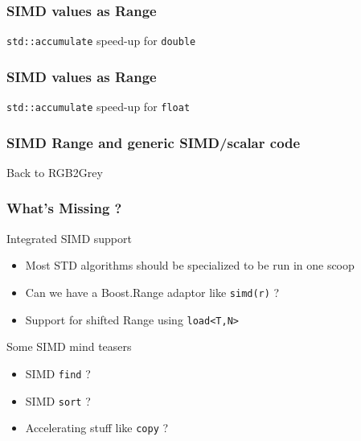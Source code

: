 \frame
{
  \frametitle{SIMD values as Range}
  \begin{block}{\texttt{std::accumulate} speed-up for \texttt{double}}
  \begin{center}
  \end{center}
  \end{block}{}
}


\frame
{
  \frametitle{SIMD values as Range}
  \begin{block}{\texttt{std::accumulate} speed-up for \texttt{float}}
  \begin{center}
  \end{center}
  \end{block}{}
}

\frame
{
  \frametitle{SIMD Range and generic SIMD/scalar code}
  \begin{block}{Back to RGB2Grey}
  \begin{center}
  \lstrangergb
  \end{center}
  \end{block}{}
}

\frame
{
  \frametitle{What's Missing ?}
  \begin{block}{Integrated SIMD support}
  \begin{itemize}\footnotesize
  \item Most STD algorithms should be specialized to be run in one scoop
  \item Can we have a Boost.Range adaptor like \texttt{simd(r)} ?
  \item Support for shifted Range using \texttt{load<T,N>}
  \end{itemize}
  \end{block}{}

  \begin{block}{Some SIMD mind teasers}
  \begin{itemize}\footnotesize
  \item SIMD \texttt{find} ? 
  \item SIMD \texttt{sort} ? 
  \item Accelerating stuff like \texttt{copy} ?
  \end{itemize}
  \end{block}{}
}
